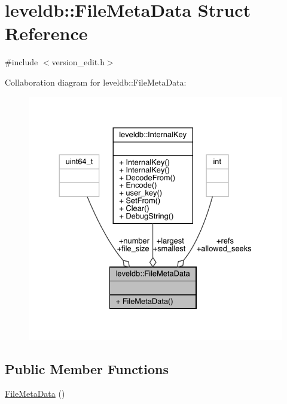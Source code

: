 \hypertarget{structleveldb_1_1_file_meta_data}{}\section{leveldb\+::File\+Meta\+Data Struct Reference}
\label{structleveldb_1_1_file_meta_data}


{\ttfamily \#include $<$version\+\_\+edit.\+h$>$}



Collaboration diagram for leveldb\+::File\+Meta\+Data\+:
\nopagebreak
\begin{figure}[H]
\begin{center}
\leavevmode
\includegraphics[width=330pt]{structleveldb_1_1_file_meta_data__coll__graph}
\end{center}
\end{figure}
\subsection*{Public Member Functions}
\begin{DoxyCompactItemize}
\item 
\mbox{\hyperlink{structleveldb_1_1_file_meta_data_ab809d499cd560df58cc5c529bb69980a}{File\+Meta\+Data}} ()
\end{DoxyCompactItemize}
